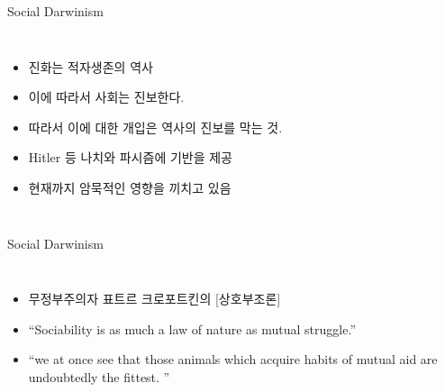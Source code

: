 \documentclass[final]{beamer}
\begin{document}
\begin{frame}[t]{Social Darwinism}
	\begin{columns}[c]
		\column{18em}
		\begin{itemize}
			\item 진화는 적자생존의 역사 
			\item 이에 따라서 사회는 진보한다. 
			\item 따라서 이에 대한 개입은 역사의 진보를 막는 것. 
			\item Hitler 등 나치와 파시즘에 기반을 제공 
			\item 현재까지 암묵적인 영향을 끼치고 있음 
		\end{itemize}
		\column{12em}
	\end{columns}
\end{frame}

\begin{frame}[t]{Social Darwinism}
	\begin{columns}[c]
		\column{18em}
		\begin{itemize}
			\item 무정부주의자 표트르 크로포트킨의 [상호부조론]
			\item ``Sociability is as much a law of nature as mutual struggle.''
			\item ``we at once see that those animals which acquire habits of mutual aid are undoubtedly the fittest. ''
		\end{itemize}
		\column{12em}
	\end{columns}
\end{frame}
\end{document}
